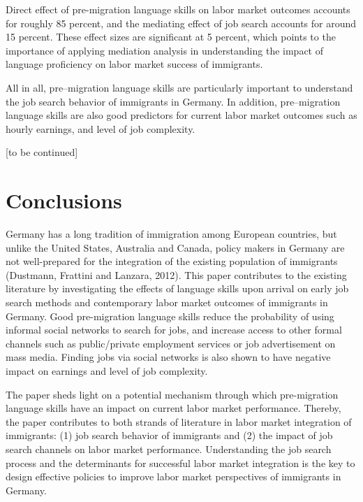 \documentclass[12pt,a4paper]{article}
\begin{document}
Direct effect of pre-migration language skills on labor market outcomes accounts for roughly 85 percent, and the mediating effect of job search accounts for around 15 percent. These effect sizes are significant at 5 percent, which points to the importance of applying mediation analysis in understanding the impact of language proficiency on labor market success of immigrants. 

All in all, pre--migration language skills are particularly important to understand the job search behavior of immigrants in Germany. In addition, pre--migration language skills are also good predictors for current labor market outcomes such as hourly earnings, and level of job complexity.

\begin{center}
[to be continued]
\end{center} 

\section{Conclusions}

Germany has a long tradition of immigration among European countries, but unlike the United States, Australia and Canada, policy makers in Germany are not well-prepared for the integration of the existing population of immigrants (Dustmann, Frattini and Lanzara, 2012). This paper contributes to the existing literature by investigating the effects of language skills upon arrival on early job search methods and contemporary labor market outcomes of immigrants in Germany. Good pre-migration language skills reduce the probability of using informal social networks to search for jobs, and increase access to other formal channels such as public/private employment services or job advertisement on mass media. Finding jobs via social networks is also shown to have negative impact on earnings and level of job complexity.

The paper sheds light on a potential mechanism through which pre-migration language skills have an impact on current labor market performance. Thereby, the paper contributes to both strands of literature in labor market integration of immigrants: (1) job search behavior of immigrants and (2) the impact of job search channels on labor market performance. Understanding the job search process and the determinants for successful labor market integration is the key to design effective policies to improve labor market perspectives of immigrants in Germany.
\end{document}
